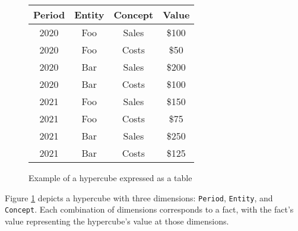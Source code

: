 \begin{figure}[H]
    \centering
    \begin{tabular}{|c|c|c|c|}
        \hline
        Period & Entity & Concept & Value \\
        \hline
        2020 & Foo & Sales & \$100 \\
        \hline
        2020 & Foo & Costs & \$50 \\
        \hline
        2020 & Bar & Sales & \$200 \\
        \hline
        2020 & Bar & Costs & \$100 \\
        \hline
        2021 & Foo & Sales & \$150 \\
        \hline
        2021 & Foo & Costs & \$75 \\
        \hline
        2021 & Bar & Sales & \$250 \\
        \hline
        2021 & Bar & Costs & \$125 \\
        \hline
    \end{tabular}
    \caption{Example of a hypercube expressed as a table}
    \label{fig:example_hypercube}
\end{figure}

Figure \ref{fig:example_hypercube} depicts a hypercube with three dimensions: \texttt{Period}, \texttt{Entity}, and \texttt{Concept}.
Each combination of dimensions corresponds to a fact, with the fact's value representing the hypercube's value at those dimensions.





